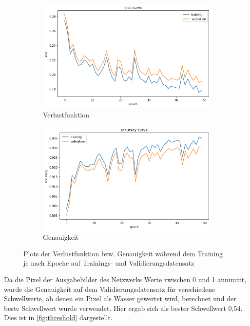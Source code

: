 \begin{figure}
    \centering
    \begin{subfigure}{0.45\textwidth}
        \centering
        \includegraphics[width=\textwidth]{images/loss_curve.png}
        \caption{Verlustfunktion}
        \label{fig:loss_curve}
    \end{subfigure}
    \begin{subfigure}{0.45\textwidth}
        \centering
        \includegraphics[width=\textwidth]{images/acc_curve.png}
        \caption{Genauigkeit}
        \label{fig:acc_curve}
    \end{subfigure}
    \caption{Plots der Verlustfunktion bzw. Genauigkeit während dem Training je nach Epoche auf Trainings- und Validierungsdatensatz}
    \label{fig:train_hist}
\end{figure}

Da die Pixel der Ausgabebilder des Netzwerks Werte zwischen 0 und 1 annimmt, wurde die Genauigkeit auf dem Validierungsdatensatz
für verschiedene Schwellwerte, ab denen ein Pixel als Wasser gewertet wird, berechnet und der beste Schwellwert wurde verwendet.
Hier ergab sich als bester Schwellwert 0,54.
Dies ist in \autoref{fig:threshold} dargestellt.

